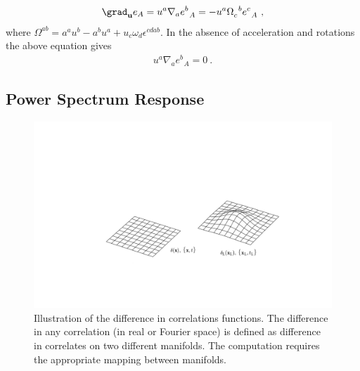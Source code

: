 \begin{align} 
\grad_\mathbf{u} e_A= u^a\nabla_a e^b_{\;\; A} = - u^a \Omega_c^{\;\; b} e^c_{\;\; A}~, 
\end{align} 
where $\Omega^{ab}=a^au^b - a^bu^a + u_c\omega_d \epsilon^{cdab}$. In the absence of acceleration and rotations the above equation gives 
\begin{align} 
 u^a\nabla_a e^b_{\;\; A}=0~.
 \end{align} 

\subsection{Power Spectrum Response}  

\begin{figure}[!ht]
 \centering
\includegraphics[width=1\textwidth]{manifolds.png}
  \caption{Illustration of the difference in correlations functions. The difference in any correlation (in real or Fourier space) is defined as difference in correlates on two different manifolds. The computation requires the appropriate mapping between manifolds. }
\label{fig:manifolds}
\end{figure}


